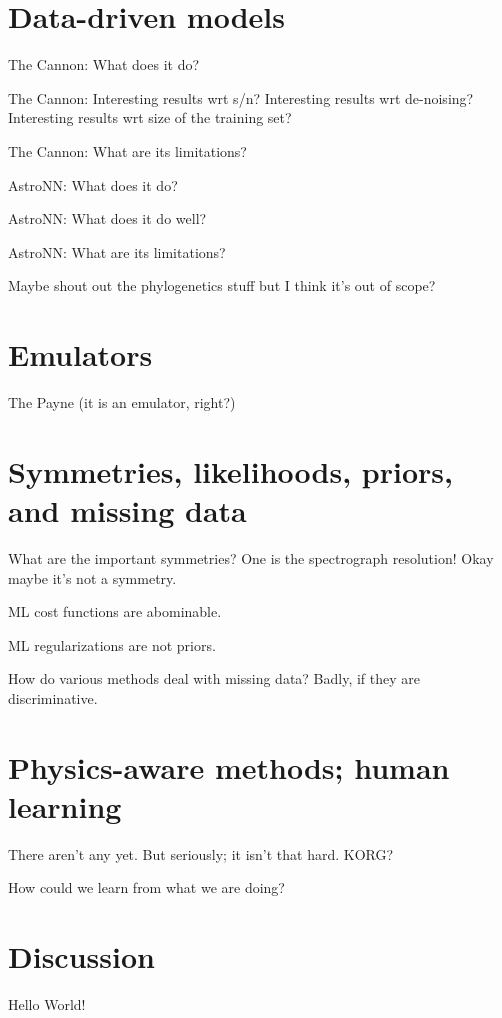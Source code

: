 \documentclass[modern]{aastex631}
\begin{document}
\section{Data-driven models}

The Cannon: What does it do?

The Cannon: Interesting results wrt s/n? Interesting results wrt de-noising? Interesting results wrt size of the training set?

The Cannon: What are its limitations?

AstroNN: What does it do?

AstroNN: What does it do well?

AstroNN: What are its limitations?

Maybe shout out the phylogenetics stuff but I think it's out of scope?

\section{Emulators}

The Payne (it is an emulator, right?)

\section{Symmetries, likelihoods, priors, and missing data}

What are the important symmetries? One is the spectrograph resolution! Okay maybe it's not a symmetry.

ML cost functions are abominable.

ML regularizations are not priors.

How do various methods deal with missing data? Badly, if they are discriminative.

\section{Physics-aware methods; human learning}

There aren't any yet. But seriously; it isn't that hard. KORG?

How could we learn from what we are doing?

\section{Discussion}

Hello World!

{}

\end{document}
